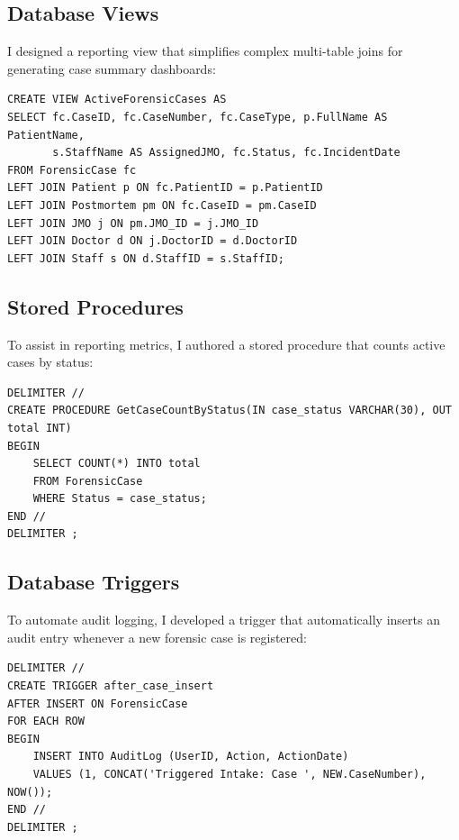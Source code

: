 \documentclass[12pt,a4paper]{article}
\begin{document}
\subsection{Database Views}
I designed a reporting view that simplifies complex multi-table joins for generating case summary dashboards:
\begin{lstlisting}
CREATE VIEW ActiveForensicCases AS
SELECT fc.CaseID, fc.CaseNumber, fc.CaseType, p.FullName AS PatientName, 
       s.StaffName AS AssignedJMO, fc.Status, fc.IncidentDate
FROM ForensicCase fc
LEFT JOIN Patient p ON fc.PatientID = p.PatientID
LEFT JOIN Postmortem pm ON fc.CaseID = pm.CaseID
LEFT JOIN JMO j ON pm.JMO_ID = j.JMO_ID
LEFT JOIN Doctor d ON j.DoctorID = d.DoctorID
LEFT JOIN Staff s ON d.StaffID = s.StaffID;
\end{lstlisting}

\subsection{Stored Procedures}
To assist in reporting metrics, I authored a stored procedure that counts active cases by status:
\begin{lstlisting}
DELIMITER //
CREATE PROCEDURE GetCaseCountByStatus(IN case_status VARCHAR(30), OUT total INT)
BEGIN
    SELECT COUNT(*) INTO total 
    FROM ForensicCase 
    WHERE Status = case_status;
END //
DELIMITER ;
\end{lstlisting}

\subsection{Database Triggers}
To automate audit logging, I developed a trigger that automatically inserts an audit entry whenever a new forensic case is registered:
\begin{lstlisting}
DELIMITER //
CREATE TRIGGER after_case_insert
AFTER INSERT ON ForensicCase
FOR EACH ROW
BEGIN
    INSERT INTO AuditLog (UserID, Action, ActionDate)
    VALUES (1, CONCAT('Triggered Intake: Case ', NEW.CaseNumber), NOW());
END //
DELIMITER ;
\end{lstlisting}

\end{document}
